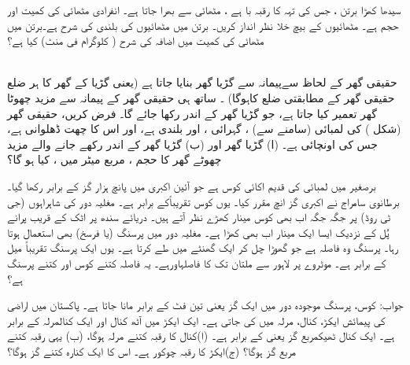  سیدھا کھڑا برتن ، جس کی تہہ  کا رقبہ با ہے ،   مٹھائی  سے بھرا جاتا ہے۔ انفرادی  مٹھائی کی کمیت اور حجم ہے۔ مٹھائیوں  کے بیچ  خلا نظر انداز کریں۔  برتن میں مٹھائیوں کی بلندی کی  شرح    ہے۔برتن میں  مٹھائی کی  کمیت میں اضافہ  کی شرح   ( کلوگرام فی منٹ) کیا ہے؟ 

\\
حقیقی گھر کے لحاظ سےپیمانہ   سے گڑیا  گھر بنایا جاتا ہے (یعنی گڑیا کے گھر کا ہر ضلع حقیقی  گھر کے مطابقتی ضلع کاہوگا)  ۔ ساتھ ہی حقیقی گھر کے پیمانہ سے  مزید چھوٹا گھر تعمیر کیا جاتا ہے، جو گڑیا  گھر کے اندر رکھا جائے گا۔ فرض کریں، حقیقی گھر (شکل )  کی لمبائی (سامنے سے)  ، گہرائی  ، اور بلندی  ہے،  اور اس کا چھت ڈھلوانی ہے،  جس کی اونچائی   ہے۔  (ا) گڑیا گھر  اور  (ب)  گڑیا گھر کے اندر رکھے جانے والے مزید چھوٹے گھر کا حجم  ، مربع میٹر میں  ، کیا ہو گا؟ 

برصغیر میں لمبائی کی قدیم اکائی کوس ہے جو آئین  اکبری میں پانچ ہزار گز کے برابر رکھا گیا۔ برطانوی سامراج نے  اکبری گز  انچ مقرر کیا۔ یوں  کوس تقریباًکے برابر ہے۔ مغلیہ دور کی شاہراہوں (جی ٹی روڈ) پر جگہ جگہ اب بھی کوس مینار کھڑے نظر آتے ہیں۔ دریائے سندھ پر اٹک کے قریب پرانے پُل کے نزدیک ایسا ایک مینار اب بھی کھڑا ہے۔ مغلیہ دور میں پرسنگ (یا فرسخ)   بھی استعمال ہوتا رہا۔ پرسنگ  وہ فاصلہ ہے جو  گھوڑا چل کر ایک گھنٹے میں طے کرتا ہے۔ یوں ایک پرسنگ تقریباً  میل کے برابر ہے۔ موٹروے پر لاہور سے ملتان تک کا فاصلہاورہے۔ یہ فاصلہ کتنے کوس اور کتنے پرسنگ ہے؟  

جواب: کوس، پرسنگ  
موجودہ دور میں ایک گز   یعنی تین فٹ کے برابر مانا جاتا ہے۔ پاکستان میں  اراضی  کی پیمائش ایکڑ، کنال، مرلہ میں کی جاتی ہے۔ ایک ایکڑ میں آٹھ کنال اور  ایک کنالمرلہ کے برابر ہے۔ ایک کنال ٹھیکمربع گز یعنی  کے برابر ہے۔  (ا)کنال کا رقبہ کتنے مرلہ ہوگا،   (ب) یہی رقبہ کتنے مربع گز ہوگا؟  (ج)ایکڑ کا رقبہ چوکور  ہے۔ اس کا ایک کنارہ کتنے گز ہوگا؟ 

